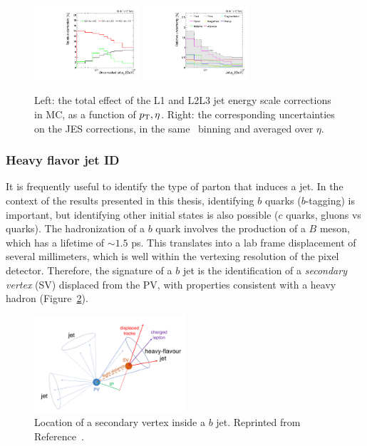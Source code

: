 \begin{figure}[]
\begin{center}
	\includegraphics[width=0.35\textwidth]{figures/cms/jec_jotjotRawPt.pdf}
	\includegraphics[width=0.35\textwidth]{figures/cms/var_jotjotPt.pdf}
	\caption{Left: the total effect of the L1 and L2L3 jet energy scale corrections in MC, as a function of $p_\mathrm{T},\eta$.
			 Right: the corresponding uncertainties on the JES corrections, in the same \pt~binning and averaged over $\eta$.}
	\label{fig:cms:jec}
\end{center}
\end{figure}

\subsubsection{Heavy flavor jet ID}

It is frequently useful to identify the type of parton that induces a jet.
In the context of the results presented in this thesis, identifying $b$ quarks ($b$-tagging) is important, but identifying other initial states is also possible ($c$ quarks, gluons vs quarks). 
The hadronization of a $b$ quark involves the production of a $B$ meson, which has a lifetime of $\sim 1.5$ ps. 
This translates into a lab frame displacement of several millimeters, which is well within the vertexing resolution of the pixel detector.
Therefore, the signature of a $b$ jet is the identification of a \emph{secondary vertex} (SV) displaced from the PV, with properties consistent with a heavy hadron (Figure~\ref{fig:cms:bjet}).

\begin{figure}[]
\begin{center}
	\includegraphics[width=0.5\textwidth]{figures/cms/bjet.png}
	\caption{Location of a secondary vertex inside a $b$ jet.
			 Reprinted from Reference~\cite{csvv2}.}
	\label{fig:cms:bjet}
\end{center}
\end{figure}

